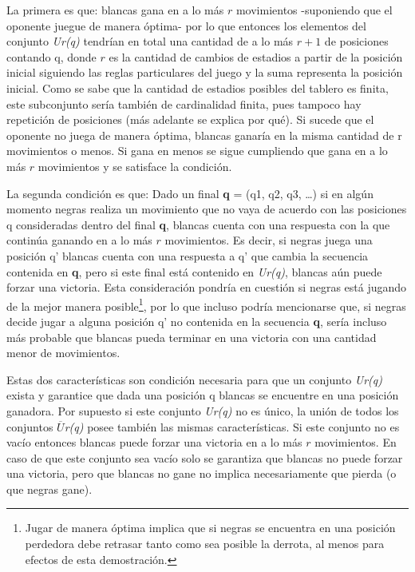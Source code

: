 \documentclass[twoside,openright,12pt,a4paper,spanish]{book}
\begin{document}
La primera es que: blancas gana en a lo más $r$ movimientos -suponiendo que el oponente juegue de manera óptima- por lo que entonces los elementos del conjunto \emph{Ur(q)} tendrían en total una cantidad de a lo más $r + 1$ de posiciones contando q, donde $r$ es la cantidad de cambios de estadios a partir de la posición inicial siguiendo las reglas particulares del juego y la suma representa la posición inicial. Como se sabe que la cantidad de estadios posibles del tablero es finita, este subconjunto sería también de cardinalidad finita, pues tampoco hay repetición de posiciones (más adelante se explica por qué). Si sucede que el oponente no juega de manera óptima, blancas ganaría en la misma cantidad de r movimientos o menos. Si gana en menos se sigue cumpliendo que gana en a lo más $r$ movimientos y se satisface la condición.

La segunda condición es que: Dado un final \textbf{q} = (q1, q2, q3, …) si en algún momento negras realiza un movimiento que no vaya de acuerdo con las posiciones q consideradas dentro del final \textbf{q}, blancas cuenta con una respuesta con la que continúa ganando en a lo más $r$ movimientos. Es decir, si negras juega una posición q’ blancas cuenta con una respuesta a q’ que cambia la secuencia contenida en \textbf{q}, pero si este final está contenido en \emph{Ur(q)}, blancas aún puede forzar una victoria. Esta consideración pondría en cuestión si negras está jugando de la mejor manera posible\footnote{Jugar de manera óptima implica que si negras se encuentra en una posición perdedora debe retrasar tanto como sea posible la derrota, al menos para efectos de esta demostración.}, por lo que incluso podría mencionarse que, si negras decide jugar a alguna posición q’ no contenida en la secuencia \textbf{q}, sería incluso más probable que blancas pueda terminar en una victoria con una cantidad menor de movimientos.

Estas dos características son condición necesaria para que un conjunto \emph{Ur(q)} exista y garantice que dada una posición q blancas se encuentre en una posición ganadora. Por supuesto si este conjunto \emph{Ur(q)} no es único, la unión de todos los conjuntos $\overline{U}$\emph{r(q)} posee también las mismas características. Si este conjunto no es vacío entonces blancas puede forzar una victoria en a lo más $r$ movimientos. En caso de que este conjunto sea vacío solo se garantiza que blancas no puede forzar una victoria, pero que blancas no gane no implica necesariamente que pierda (o que negras gane).
\end{document}
